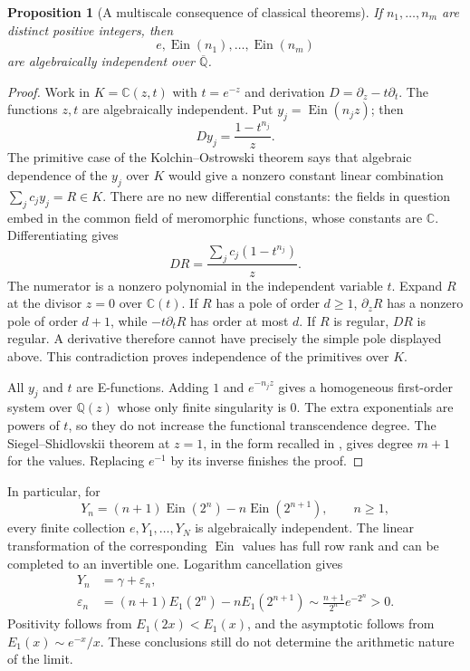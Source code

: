 \documentclass[11pt,a4paper]{article}
\newtheorem{proposition}[theorem]{Proposition}
\theoremstyle{definition}
\theoremstyle{remark}
\numberwithin{equation}{section}
\begin{document}
\begin{proposition}[A multiscale consequence of classical theorems]
\label{gamma-multiscale-prop}
If $n_1,\ldots,n_m$ are distinct positive integers, then
\[
 e,\operatorname{Ein}(n_1),\ldots,\operatorname{Ein}(n_m)
\]
are algebraically independent over $\overline{\mathbb Q}$.
\end{proposition}
\begin{proof}
Work in $K=\mathbb C(z,t)$ with $t=e^{-z}$ and derivation
$D=\partial_z-t\partial_t$. The functions $z,t$ are algebraically
independent. Put $y_j=\operatorname{Ein}(n_jz)$; then
\[
 Dy_j=\frac{1-t^{n_j}}z.
\]
The primitive case of the Kolchin--Ostrowski theorem
\cite[Theorem 2.5]{gamma-Srinivasan} says that algebraic dependence
of the $y_j$ over $K$ would give a nonzero constant linear combination
$\sum_jc_jy_j=R\in K$. There are no new differential constants: the
fields in question embed in the common field of meromorphic functions,
whose constants are $\mathbb C$. Differentiating gives
\[
 DR=\frac{\sum_jc_j(1-t^{n_j})}{z}.
\]
The numerator is a nonzero polynomial in the independent variable $t$.
Expand $R$ at the divisor $z=0$ over $\mathbb C(t)$. If $R$ has a
pole of order $d\ge1$, $\partial_zR$ has a nonzero pole of order
$d+1$, while $-t\partial_tR$ has order at most $d$. If $R$ is regular,
$DR$ is regular. A derivative therefore cannot have precisely the
simple pole displayed above. This contradiction proves independence
of the primitives over $K$.

All $y_j$ and $t$ are E-functions. Adding $1$ and $e^{-n_jz}$ gives
a homogeneous first-order system over $\mathbb Q(z)$ whose only finite
singularity is $0$. The extra exponentials are powers of $t$, so they
do not increase the functional transcendence degree. The
Siegel--Shidlovskii theorem at $z=1$, in the form recalled in
\cite{gamma-Effective}, gives degree $m+1$ for the values. Replacing
$e^{-1}$ by its inverse finishes the proof.
\end{proof}

In particular, for
\[
 Y_n=(n+1)\operatorname{Ein}(2^n)-n\operatorname{Ein}(2^{n+1}),
 \qquad n\ge1,
\]
every finite collection $e,Y_1,\ldots,Y_N$ is algebraically independent.
The linear transformation of the corresponding $\operatorname{Ein}$
values has full row rank and can be completed to an invertible one.
Logarithm cancellation gives
\begin{align*}
 Y_n&=\gamma+\varepsilon_n,\\
 \varepsilon_n&=(n+1)E_1(2^n)-nE_1(2^{n+1})
 \sim\frac{n+1}{2^n}e^{-2^n}>0.
\end{align*}
Positivity follows from $E_1(2x)<E_1(x)$, and the asymptotic follows
from $E_1(x)\sim e^{-x}/x$. These conclusions still do not determine
the arithmetic nature of the limit.
\end{document}
